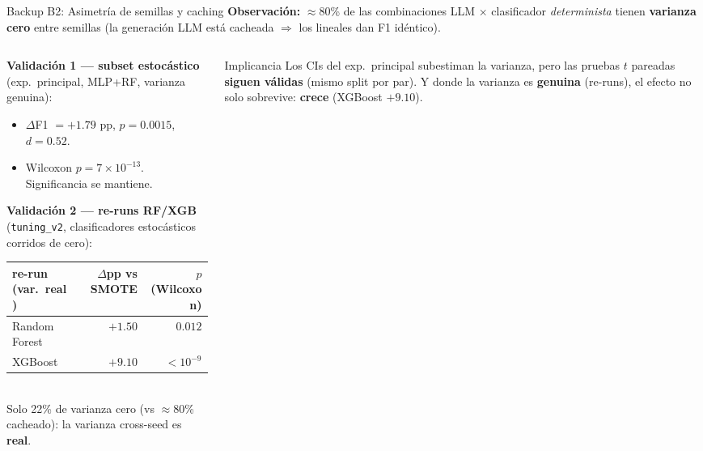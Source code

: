 \begin{frame}{Backup B2: Asimetría de semillas y caching}
\small
\textbf{Observación:} $\approx$80\% de las combinaciones LLM $\times$ clasificador \emph{determinista} tienen \textbf{varianza cero} entre semillas (la generación LLM está cacheada $\Rightarrow$ los lineales dan F1 idéntico).

\vspace{0.3em}
\begin{columns}[T]

\begin{column}{0.58\textwidth}
\scriptsize
\textbf{Validación 1 --- subset estocástico} (exp.\ principal, MLP+RF, varianza genuina):
\begin{itemize}\setlength\itemsep{0pt}
  \item $\Delta$F1 $= +1{.}79$ pp, $p = 0{.}0015$, $d = 0{.}52$.
  \item Wilcoxon $p = 7{\times}10^{-13}$. Significancia se mantiene.
\end{itemize}

\vspace{0.4em}
\textbf{Validación 2 --- re-runs RF/XGB} (\texttt{tuning\_v2}, clasificadores estocásticos corridos de cero):

\vspace{2pt}
\begin{tabular}{@{}lrr@{}}
\toprule
re-run (var.\ real) & $\Delta$pp vs SMOTE & $p$ (Wilcoxon) \\
\midrule
Random Forest & $+1{.}50$ & $0{.}012$ \\
XGBoost       & $+9{.}10$ & $<10^{-9}$ \\
\bottomrule
\end{tabular}\\[3pt]
{\tiny Solo 22\% de varianza cero (vs $\approx$80\% cacheado): la varianza cross-seed es \textbf{real}.}
\end{column}

\begin{column}{0.42\textwidth}
\begin{block}{Implicancia}
\scriptsize
Los CIs del exp.\ principal subestiman la varianza, pero las pruebas $t$ pareadas \textbf{siguen válidas} (mismo split por par). Y donde la varianza es \textbf{genuina} (re-runs), el efecto no solo sobrevive: \textbf{crece} (XGBoost $+9{.}10$).
\end{block}
\end{column}

\end{columns}
\end{frame}

